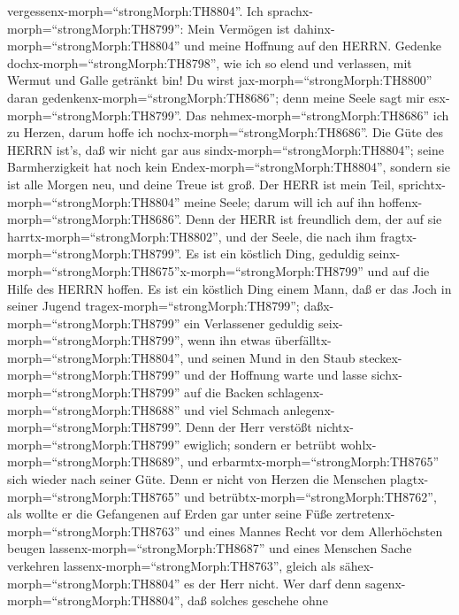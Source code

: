 vergessenx-morph=``strongMorph:TH8804''.  Ich
sprachx-morph=``strongMorph:TH8799'': Mein Vermögen ist
dahinx-morph=``strongMorph:TH8804'' und meine Hoffnung auf den HERRN.
 Gedenke dochx-morph=``strongMorph:TH8798'', wie ich so
elend und verlassen, mit Wermut und Galle getränkt bin!  Du
wirst jax-morph=``strongMorph:TH8800'' daran
gedenkenx-morph=``strongMorph:TH8686''; denn meine Seele sagt mir
esx-morph=``strongMorph:TH8799''.  Das
nehmex-morph=``strongMorph:TH8686'' ich zu Herzen, darum hoffe ich
nochx-morph=``strongMorph:TH8686''.  Die Güte des HERRN
ist's, daß wir nicht gar aus sindx-morph=``strongMorph:TH8804''; seine
Barmherzigkeit hat noch kein Endex-morph=``strongMorph:TH8804'',
 sondern sie ist alle Morgen neu, und deine Treue ist groß.
 Der HERR ist mein Teil,
sprichtx-morph=``strongMorph:TH8804'' meine Seele; darum will ich auf
ihn hoffenx-morph=``strongMorph:TH8686''.  Denn der HERR
ist freundlich dem, der auf sie harrtx-morph=``strongMorph:TH8802'', und
der Seele, die nach ihm fragtx-morph=``strongMorph:TH8799''.
 Es ist ein köstlich Ding, geduldig
seinx-morph=``strongMorph:TH8675''x-morph=``strongMorph:TH8799'' und auf
die Hilfe des HERRN hoffen.  Es ist ein köstlich Ding einem
Mann, daß er das Joch in seiner Jugend
tragex-morph=``strongMorph:TH8799''; 
daßx-morph=``strongMorph:TH8799'' ein Verlassener geduldig
seix-morph=``strongMorph:TH8799'', wenn ihn etwas
überfälltx-morph=``strongMorph:TH8804'',  und seinen Mund
in den Staub steckex-morph=``strongMorph:TH8799'' und der Hoffnung warte
 und lasse sichx-morph=``strongMorph:TH8799'' auf die
Backen schlagenx-morph=``strongMorph:TH8688'' und viel Schmach
anlegenx-morph=``strongMorph:TH8799''.  Denn der Herr
verstößt nichtx-morph=``strongMorph:TH8799'' ewiglich; 
sondern er betrübt wohlx-morph=``strongMorph:TH8689'', und
erbarmtx-morph=``strongMorph:TH8765'' sich wieder nach seiner Güte.
 Denn er nicht von Herzen die Menschen
plagtx-morph=``strongMorph:TH8765'' und
betrübtx-morph=``strongMorph:TH8762'',  als wollte er die
Gefangenen auf Erden gar unter seine Füße
zertretenx-morph=``strongMorph:TH8763''  und eines Mannes
Recht vor dem Allerhöchsten beugen lassenx-morph=``strongMorph:TH8687''
 und eines Menschen Sache verkehren
lassenx-morph=``strongMorph:TH8763'', gleich als
sähex-morph=``strongMorph:TH8804'' es der Herr nicht.  Wer
darf denn sagenx-morph=``strongMorph:TH8804'', daß solches geschehe ohne
